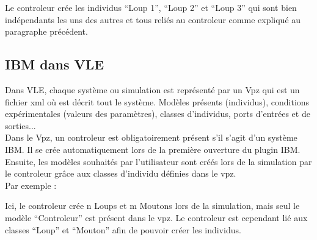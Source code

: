 Le controleur crée les individus ``Loup 1'', ``Loup 2'' et ``Loup 3'' qui sont bien indépendants les uns des autres et tous reliés au controleur comme expliqué au paragraphe précédent. \\

\subsection{IBM dans VLE}
Dans VLE, chaque système ou simulation est représenté par un Vpz qui est un fichier xml où est décrit tout le système. Modèles présents (individus), conditions expérimentales (valeurs des paramètres), classes d'individus, ports d'entrées et de sorties...\\
Dans le Vpz, un controleur est obligatoirement présent s'il s'agit d'un système IBM. Il se crée automatiquement lors de la première ouverture du plugin IBM. \\Ensuite, les modèles souhaités par l'utilisateur sont créés lors de la simulation par le controleur grâce aux classes d'individu définies dans le vpz.\\
Par exemple : \\
\noindent\begin{minipage}{\linewidth}%
\end{minipage}

Ici, le controleur crée n Loups et m Moutons lors de la simulation, mais seul le modèle ``Controleur'' est présent dans le vpz. Le controleur est cependant lié aux classes ``Loup'' et ``Mouton'' afin de pouvoir créer les individus.

